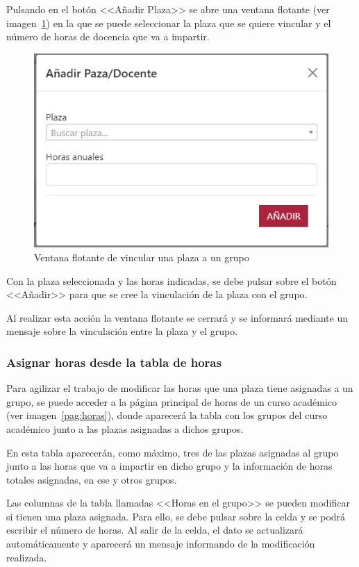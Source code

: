 Pulsando en el botón <<Añadir Plaza>> se abre una ventana flotante (ver imagen~\ref{pag:flotanteAddPlaza}) en la que se puede seleccionar la plaza que se quiere vincular y el número de horas de docencia que va a impartir.

\begin{figure}
	\centering
	\includegraphics[width=.7\textwidth]{../img/Anexos/Manual usuario/flotanteAddPlaza.png}
	\caption{Ventana flotante de vincular una plaza a un grupo}\label{pag:flotanteAddPlaza}
\end{figure}

Con la plaza seleccionada y las horas indicadas, se debe pulsar sobre el botón <<Añadir>> para que se cree la vinculación de la plaza con el grupo.

Al realizar esta acción la ventana flotante se cerrará y se informará mediante un mensaje sobre la vinculación entre la plaza y el grupo.

\subsubsection{Asignar horas desde la tabla de horas}
Para agilizar el trabajo de modificar las horas que una plaza tiene asignadas a un grupo, se puede acceder a la página principal de horas de un curso académico (ver imagen~\ref{pag:horas}), donde aparecerá la tabla con los grupos del curso académico junto a las plazas asignadas a dichos grupos.

En esta tabla aparecerán, como máximo, tres de las plazas asignadas al grupo junto a las horas que va a impartir en dicho grupo y la información de horas totales asignadas, en ese y otros grupos.

Las columnas de la tabla llamadas <<Horas en el grupo>> se pueden modificar si tienen una plaza asignada.
Para ello, se debe pulsar sobre la celda y se podrá escribir el número de horas.
Al salir de la celda, el dato se actualizará automáticamente y aparecerá un mensaje informando de la modificación realizada.

